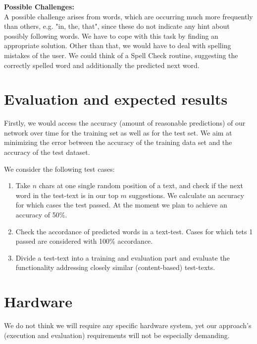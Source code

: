 \documentclass[a4paper,11pt]{scrartcl}
\begin{document}
\textbf{Possible Challenges:}\\
A possible challenge arises from words, which are occurring much more frequently than others, e.g. "in, the, that", since these do not indicate any hint about possibly following words. We have to cope with this task by finding an appropriate solution. Other than that, we would have to deal with spelling mistakes of the user. We could think of a Spell Check routine, suggesting the correctly spelled word and additionally the predicted next word.


\section*{Evaluation and expected results}

Firstly, we would access the accuracy (amount of reasonable predictions) of our network over time for the training set as well as for the test set. We aim at minimizing the error between the accuracy of the training data set and the accuracy of the test dataset. 

We consider the following test cases:
\begin{enumerate}
\item Take $n$ chars at one single random position of a text, and check if the next word in the test-text is in our top $m$ suggestions. We calculate an accuracy for which cases the test passed. At the moment we plan to achieve an accuracy of 50\%.
\item Check the accordance of predicted words in a text-test. Cases for which tets 1 passed are considered with 100\% accordance.
\item Divide a test-text into a training and evaluation part and evaluate the functionality addressing closely similar (content-based) test-texts.
\end{enumerate}

\section*{Hardware}

We do not think we will require any specific hardware system, yet our approach's (execution and evaluation) requirements will not be especially demanding.
\end{document}
